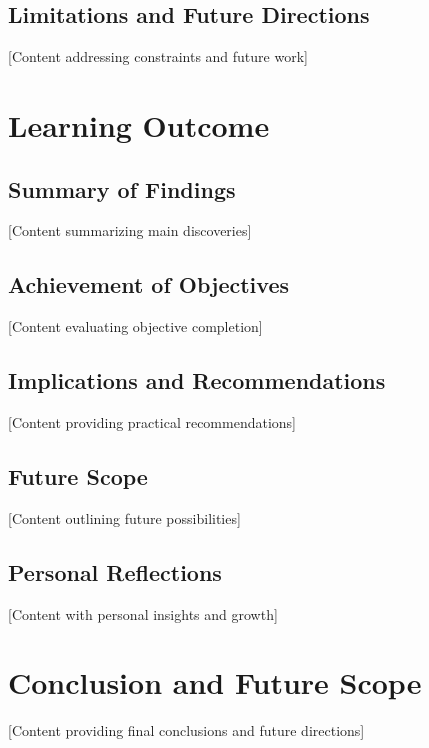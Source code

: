 \documentclass[11pt,a4paper]{article}
\begin{document}
\subsection{Limitations and Future Directions}
[Content addressing constraints and future work]

\section{Learning Outcome}

\subsection{Summary of Findings}
[Content summarizing main discoveries]

\subsection{Achievement of Objectives}
[Content evaluating objective completion]

\subsection{Implications and Recommendations}
[Content providing practical recommendations]

\subsection{Future Scope}
[Content outlining future possibilities]

\subsection{Personal Reflections}
[Content with personal insights and growth]

\section{Conclusion and Future Scope}
[Content providing final conclusions and future directions]

\end{document}
